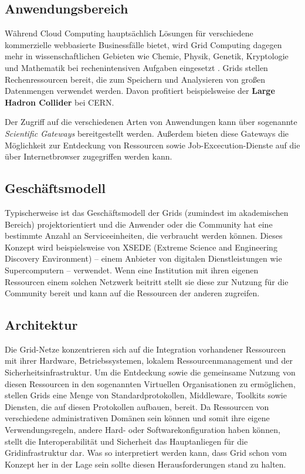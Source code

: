 \subsection{Anwendungsbereich}
Während Cloud Computing hauptsächlich Lösungen für verschiedene kommerzielle webbasierte Businessfälle bietet, wird Grid Computing dagegen mehr in wissenschaftlichen Gebieten wie Chemie, Physik, Genetik, Kryptologie und Mathematik bei rechenintensiven Aufgaben eingesetzt \cite{5623257}.
Grids stellen Rechenressourcen bereit, die zum Speichern und Analysieren von großen Datenmengen verwendet werden. Davon profitiert beispielsweise der \textbf{Large Hadron Collider} bei CERN.\cite{wlcg}

Der Zugriff auf die verschiedenen Arten von Anwendungen kann über sogenannte \textit{Scientific Gateways} bereitgestellt werden. Außerdem bieten diese Gateways die Möglichkeit zur Entdeckung von Ressourcen sowie Job-Excecution-Dienste auf die über Internetbrowser zugegriffen werden kann\cite{360-degree-compared}.

\subsection{Geschäftsmodell}
Typischerweise ist das Geschäftsmodell der Grids (zumindest im akademischen Bereich) projektorientiert und die Anwender oder die Community hat eine bestimmte Anzahl an Serviceeinheiten, die verbraucht werden können\cite{360-degree-compared}.  
Dieses Konzept wird beispielsweise von XSEDE (Extreme Science and Engineering Discovery Environment) -- einem Anbieter von digitalen Dienstleistungen wie Supercomputern -- verwendet\cite{xsede}.
Wenn eine Institution mit ihren eigenen Ressourcen einem solchen Netzwerk beitritt stellt sie diese zur Nutzung für die Community bereit und kann auf die Ressourcen der anderen zugreifen\cite{360-degree-compared}.



\subsection{Architektur}
Die Grid-Netze konzentrieren sich auf die Integration vorhandener Ressourcen mit ihrer Hardware, Betriebssystemen, lokalem Ressourcenmanagement und der Sicherheitsinfrastruktur.
Um die Entdeckung sowie die gemeinsame Nutzung von diesen Ressourcen in den sogenannten \glqq Virtuellen Organisationen\grqq{} zu ermöglichen, stellen Grids eine Menge von Standardprotokollen, Middleware, Toolkits sowie Diensten, die auf diesen Protokollen aufbauen, bereit.
Da Ressourcen von verschiedene administrativen Domänen sein können und somit ihre eigene Verwendungsregeln, andere Hard- oder Softwarekonfiguration haben können, stellt die Interoperabilität und Sicherheit das Hauptanliegen für die Gridinfrastruktur dar.\cite{360-degree-compared}
Was so interpretiert werden kann, dass Grid schon vom Konzept her in der Lage sein sollte diesen Herausforderungen stand zu halten.

